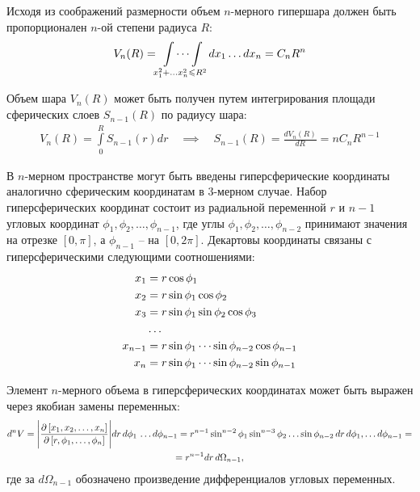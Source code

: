 Исходя из соображений размерности объем $n$-мерного гипершара должен быть пропорционален $n$-ой степени радиуса $R$:
\vverh
\begin{gather}
	V_n (R) = \idotsint\limits_{x_1^2 + \dots x_n^2 \leqslant R^2} dx_1 \dots dx_n = C_n R^n \label{int1}
\end{gather}

Объем шара $V_n(R)$ может быть получен путем интегрирования площади сферических слоев $S_{n-1}(R)$ по радиусу шара:
\vverh
\begin{gather}
	V_n(R) = \int\limits_{0}^{R} S_{n-1}(r) dr \quad \implies \quad S_{n-1}(R) = \frac{d V_n(R)}{dR} = nC_n R^{n-1} \label{surf1} 
\end{gather}

В $n$-мерном пространстве могут быть введены гиперсферические координаты аналогично сферическим координатам в 3-мерном случае. Набор гиперсферических координат состоит из радиальной переменной $r$ и $n-1$ угловых координат $\phi_1,\phi_2, \dots ,\phi_{n-1}$, где углы $\phi_1, \phi_2, \dots, \phi_{n-2}$ принимают значения на отрезке $\left[ 0, \pi \right]$, а $\phi_{n-1}$ -- на $\left[ 0, 2 \pi \right]$. Декартовы координаты связаны с гиперсферическими следующими соотношениями:
\vverh
\begin{gather}
\begin{aligned}
x_1 &= r \cos \phi_1 \\
x_2 &= r \sin \phi_1 \cos \phi_2 \\
x_3 &= r \sin \phi_1 \sin \phi_2 \cos \phi_3 \\
&\dots \\
x_{n-1} &= r \sin \phi_1 \cdots \sin \phi_{n-2} \cos \phi_{n-1} \\
x_n &= r \sin \phi_1 \cdots \sin \phi_{n-2} \sin \phi_{n-1}
\end{aligned} \notag
\end{gather}

Элемент $n$-мерного объема в гиперсферических координатах может быть выражен через якобиан замены переменных:
\vverh
\begin{gather}
	d^n V = \Bigg{|} \frac{\partial \left[ x_1, x_2, \dots, x_n \right]}{\partial \left[ r, \phi_1, \dots, \phi_n \right]} \Bigg{|} d r \, d \phi_1 \, \dots d \phi_{n-1} = r^{n-1} \sin^{n-2} \phi_1 \sin^{n-3} \phi_2 \dots \sin \phi_{n-2} \, d r \, d \phi_1, \dots d \phi_{n-1} = \notag \\
= r^{n-1} dr \, d \Omega_{n-1}, \notag
\end{gather} 
где за $d \Omega_{n-1}$ обозначено произведение дифференциалов угловых переменных. \par


